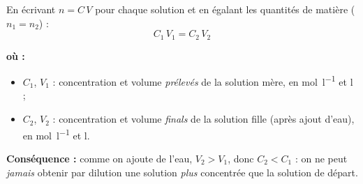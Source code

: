 \documentclass[11pt,a4paper]{article}
\newenvironment{ou}{%
  \par\smallskip\noindent\textbf{où :}\nopagebreak
  \begin{itemize}[leftmargin=1.8em,topsep=2pt,itemsep=1.5pt,parsep=0pt]}%
  {\end{itemize}}
\begin{document}
\begin{formule}
En écrivant $n = C\,V$ pour chaque solution et en égalant les quantités de matière ($n_1 = n_2$) :
\[ \boxed{\,C_1 \, V_1 = C_2 \, V_2\,} \]
\begin{ou}
  \item $C_1$, $V_1$ : concentration et volume \emph{prélevés} de la solution mère, en \si{\mole\per\litre} et \si{\litre} ;
  \item $C_2$, $V_2$ : concentration et volume \emph{finals} de la solution fille (après ajout d'eau), en \si{\mole\per\litre} et \si{\litre}.
\end{ou}
\textbf{Conséquence :} comme on ajoute de l'eau, $V_2 > V_1$, donc $C_2 < C_1$ : on ne peut
\emph{jamais} obtenir par dilution une solution \emph{plus} concentrée que la solution de départ.
\end{formule}
\end{document}
